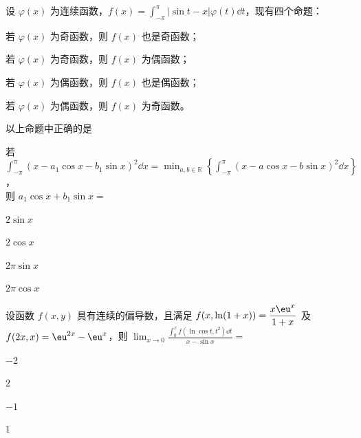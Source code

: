 \choiceheading

\begin{question}[index=1]
设 $\varphi(x)$ 为连续函数，$f(x)=\displaystyle\int_{-\pi}^{\pi}|\sin t-x|\varphi(t)\dd t$，现有四个命题：\par
{} 若 $\varphi(x)$ 为奇函数，则 $f(x)$ 也是奇函数；\par
{} 若 $\varphi(x)$ 为奇函数，则 $f(x)$ 为偶函数；\par
{} 若 $\varphi(x)$ 为偶函数，则 $f(x)$ 也是偶函数；\par
{} 若 $\varphi(x)$ 为偶函数，则 $f(x)$ 为奇函数。\par
以上命题中正确的是\paren
\begin{choices}[columns=4]
\item {}
\item {}
\item {}
\item {}
\end{choices}
\end{question}

\begin{question}[index=2]
若 $\displaystyle\int_{-\pi}^{\pi}(x-a_1\cos x-b_1\sin x)^2\dd x
=\min_{a,b\in\mathbb R}\left\{\int_{-\pi}^{\pi}(x-a\cos x-b\sin x)^2\dd x\right\}$，\\
则 $a_1\cos x+b_1\sin x=$\paren
\begin{choices}[columns=4]
\item $2\sin x$
\item $2\cos x$
\item $2\pi\sin x$
\item $2\pi\cos x$
\end{choices}
\end{question}

\begin{question}[index=3]
设函数 $f(x,y)$ 具有连续的偏导数，且满足 $f(x,\ln(1+x))=\dfrac{x\eu^x}{1+x}$ 及
$f(2x,x)=\eu^{2x}-\eu^x$，则
$\displaystyle\lim_{x\to0}\frac{\int_0^x f(\ln\cos t,t^2)\dd t}{x-\sin x}=$\paren
\begin{choices}[columns=4]
\item $-2$
\item $2$
\item $-1$
\item $1$
\end{choices}
\end{question}

